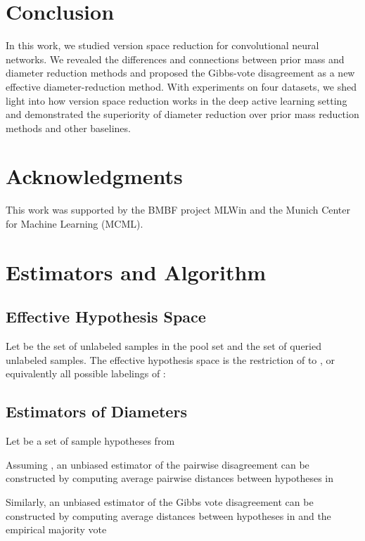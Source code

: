 \documentclass[runningheads, envcountsame, a4paper]{llncs}
\begin{document}
\section{Conclusion}
\label{sec:conclusion}
In this work, we studied version space reduction for convolutional neural networks. We revealed the differences and connections between prior mass and diameter reduction methods and proposed the Gibbs-vote disagreement as a new effective diameter-reduction method. With experiments on four datasets, we shed light into how version space reduction works in the deep active learning setting and demonstrated the superiority of diameter reduction over prior mass reduction methods and other baselines.




\section*{Acknowledgments}
This work was supported by the BMBF project MLWin and the Munich Center for Machine Learning (MCML).

\clearpage



\appendix

\section{Estimators and Algorithm}


\subsection{Effective Hypothesis Space}
Let  be the set of unlabeled samples in the pool set  and  the set of queried unlabeled samples. The effective hypothesis space  is the restriction of  to , or equivalently all possible labelings of : 



\subsection{Estimators of Diameters}
Let  be a set of  sample hypotheses from 

Assuming , an unbiased estimator of the pairwise disagreement can be constructed by computing average pairwise distances between hypotheses in 

Similarly, an unbiased estimator of the Gibbs vote disagreement can be constructed by computing average distances between hypotheses in  and the empirical majority vote 
\end{document}
